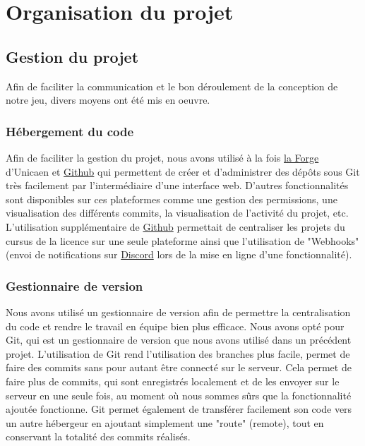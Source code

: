 \documentclass[a4paper, 12pt]{article}
\begin{document}
\newpage %

\section{Organisation du projet}

    \subsection{Gestion du projet}

		Afin de faciliter la communication et le bon déroulement de la conception de notre jeu, divers moyens ont été mis en oeuvre.

        \subsubsection{Hébergement du code}
        
            Afin de faciliter la gestion du projet, nous avons utilisé à la fois \href{https://forge.info.unicaen.fr/}{la Forge} d’Unicaen et \href{https://github.com/}{Github} qui permettent de créer et d’administrer des dépôts sous Git très facilement par l’intermédiaire d’une interface web. D’autres fonctionnalités sont disponibles  sur ces plateformes comme une gestion des permissions, une visualisation des différents commits, la visualisation de l’activité du projet, etc. L'utilisation supplémentaire de \href{https://github.com/}{Github} permettait de centraliser les projets du cursus de la licence sur une seule plateforme ainsi que l'utilisation de "Webhooks" (envoi de notifications sur \href{https://discordapp.com/}{Discord} lors de la mise en ligne d'une fonctionnalité).
            
		\subsubsection{Gestionnaire de version}

			Nous avons utilisé un gestionnaire de version afin de permettre la centralisation du code et rendre le travail en équipe bien plus efficace. Nous avons opté pour Git, qui est un gestionnaire de version que nous avons utilisé dans un précédent projet. L'utilisation de Git rend l'utilisation des branches plus facile, permet de faire des commits sans pour autant être connecté sur le serveur. Cela permet de faire plus de commits, qui sont enregistrés localement et de les envoyer sur le serveur en une seule fois, au moment où nous sommes sûrs que la fonctionnalité ajoutée fonctionne. Git permet également de transférer facilement son code vers un autre hébergeur en ajoutant simplement une "route" (remote), tout en conservant la totalité des commits réalisés.
\end{document}

